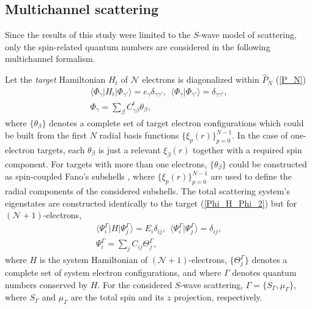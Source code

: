 \documentclass[aip
, pra
, showpacs
, aps
, twocolumn
, groupedaddress
, floatfix
]{revtex4}
\newcommand{\beq}{\begin{equation}}
\newcommand{\eeq}{\end{equation}}
\newcommand{\barr}{\begin{array}}
\newcommand{\earr}{\end{array}}
\begin{document}
\subsection{Multichannel scattering}
Since the results of this study were limited to the $S$-wave model of scattering,
only the spin-related quantum numbers are considered in the
following multichannel formalism. 


Let the {\em target} Hamiltonian $H_t$ of
$\mathcal{N}$ electrons
is diagonalized within $\hat{P}_N$ (\ref{P_N})
\beq \barr{l}
\langle \Phi_\gamma|H_t|\Phi_{\gamma'}\rangle=e_\gamma \delta_{\gamma\gamma'}, \ \
\langle \Phi_\gamma|\Phi_{\gamma'}\rangle=\delta_{\gamma\gamma'},\\
\Phi_\gamma = \sum_{\beta} C^t_{\gamma \beta} \theta_\beta,
\earr \label{Phi_H_Phi_2} \eeq
where $\{\theta_\beta\}$ denotes a complete set of target electron configurations which could be built from
the first $N$ radial basis functions $\{\xi_p(r)\}_{p=0}^{N-1}$.
In the case of one-electron targets, each
$\theta_\beta$ is just a relevant $\xi_\beta(r)$ together with a required spin component.
For targets with more than one electrons, $\{\theta_\beta\}$ could be constructed as spin-coupled Fano's subshells \cite{Fano65,KFB11},
where $\{\xi_p(r)\}_{p=0}^{N-1}$ are used to define the radial components of the considered subshells.
The total scattering system's eigenstates are constructed identically to the target (\ref{Phi_H_Phi_2})
but for $(\mathcal{N}+1)$-electrons,
\beq \barr{l}
\langle\Psi_i^\Gamma|H|\Psi_j^\Gamma\rangle=E_i\delta_{ij}, \ \
 \langle\Psi_i^\Gamma|\Psi_j^\Gamma\rangle=\delta_{ij},\\
\Psi^\Gamma_i = \sum_{j} C_{ij} \Theta^\Gamma_j,
\earr \label{Psi_H_Psi_2} \eeq
where $H$ is the system Hamiltonian of $(\mathcal{N}+1)$-electrons, $\{\Theta_j^\Gamma\}$
denotes a complete set of system electron configurations, and where
$\Gamma$ denotes quantum numbers conserved by $H$.
For the considered $S$-wave scattering,
$\Gamma=\{S_\Gamma,\mu_\Gamma\}$, where $S_\Gamma$ and $\mu_\Gamma$ are the total spin and its $z$ projection, respectively.
\end{document}
